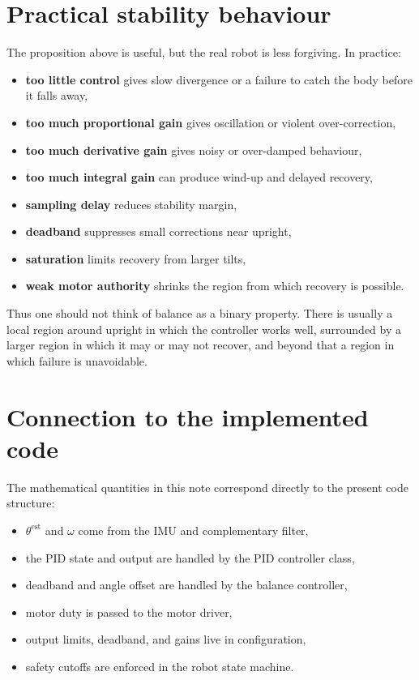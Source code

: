 \documentclass[11pt,a4paper]{article}
\begin{document}
\section{Practical stability behaviour}

The proposition above is useful, but the real robot is less forgiving. In practice:
\begin{itemize}
    \item \textbf{too little control} gives slow divergence or a failure to catch the body before it falls away,
    \item \textbf{too much proportional gain} gives oscillation or violent over-correction,
    \item \textbf{too much derivative gain} gives noisy or over-damped behaviour,
    \item \textbf{too much integral gain} can produce wind-up and delayed recovery,
    \item \textbf{sampling delay} reduces stability margin,
    \item \textbf{deadband} suppresses small corrections near upright,
    \item \textbf{saturation} limits recovery from larger tilts,
    \item \textbf{weak motor authority} shrinks the region from which recovery is possible.
\end{itemize}

Thus one should not think of balance as a binary property. There is usually a local region around upright in which the controller works well, surrounded by a larger region in which it may or may not recover, and beyond that a region in which failure is unavoidable.

\section{Connection to the implemented code}

The mathematical quantities in this note correspond directly to the present code structure:
\begin{itemize}
    \item \( \theta^{\mathrm{est}} \) and \( \omega \) come from the IMU and complementary filter,
    \item the PID state and output are handled by the PID controller class,
    \item deadband and angle offset are handled by the balance controller,
    \item motor duty is passed to the motor driver,
    \item output limits, deadband, and gains live in configuration,
    \item safety cutoffs are enforced in the robot state machine.
\end{itemize}
\end{document}

